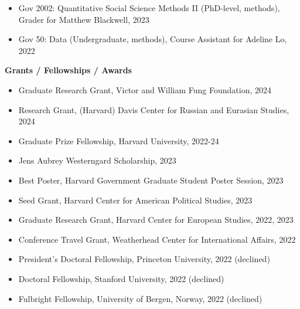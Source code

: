\documentclass[12pt]{article}
\begin{document}
\begin{footnotesize}
\begin{itemize}[noitemsep,nolistsep]
\item Gov 2002: Quantitative Social Science Methods II (PhD-level, methods), Grader for Matthew Blackwell, 2023

\item Gov 50: Data (Undergraduate, methods), Course Assistant for Adeline Lo, 2022

\end{itemize}

\vspace{5mm} 





{\bf {\normalsize Grants / Fellowships / Awards}}

\vspace{3mm} 

\vspace{1mm} 

\begin{itemize}[noitemsep,nolistsep]

\item Graduate Research Grant, Victor and William Fung Foundation, 2024

\item Research Grant, (Harvard) Davis Center for Russian and Eurasian Studies, 2024

\item Graduate Prize Fellowship, Harvard University, 2022-24

\item Jens Aubrey Westerngard Scholarship, 2023

\item Best Poster, Harvard Government Graduate Student Poster Session, 2023

\item Seed Grant, Harvard Center for American Political Studies, 2023

\item Graduate Research Grant, Harvard Center for European Studies, 2022, 2023

\item Conference Travel Grant, Weatherhead Center for International Affairs, 2022

\item President's Doctoral Fellowship, Princeton University, 2022 (declined)

\item Doctoral Fellowship, Stanford University, 2022 (declined)

\item Fulbright Fellowship, University of Bergen, Norway, 2022 (declined)


\end{itemize}
\end{footnotesize}
\end{document}
